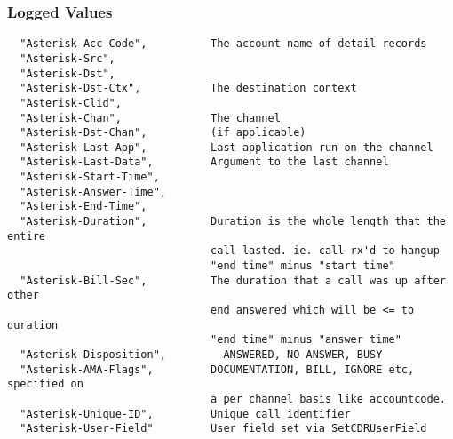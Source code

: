 \subsubsection{Logged Values}
\begin{verbatim}
  "Asterisk-Acc-Code",          The account name of detail records
  "Asterisk-Src",
  "Asterisk-Dst",
  "Asterisk-Dst-Ctx",           The destination context
  "Asterisk-Clid",
  "Asterisk-Chan",              The channel
  "Asterisk-Dst-Chan",	        (if applicable)
  "Asterisk-Last-App",	        Last application run on the channel
  "Asterisk-Last-Data",         Argument to the last channel
  "Asterisk-Start-Time",
  "Asterisk-Answer-Time",
  "Asterisk-End-Time",
  "Asterisk-Duration",          Duration is the whole length that the entire
                                call lasted. ie. call rx'd to hangup
                                "end time" minus "start time"
  "Asterisk-Bill-Sec", 	        The duration that a call was up after other
                                end answered which will be <= to duration
                                "end time" minus "answer time"
  "Asterisk-Disposition",    	  ANSWERED, NO ANSWER, BUSY
  "Asterisk-AMA-Flags",       	DOCUMENTATION, BILL, IGNORE etc, specified on
                                a per channel basis like accountcode.
  "Asterisk-Unique-ID",         Unique call identifier
  "Asterisk-User-Field"	        User field set via SetCDRUserField
\end{verbatim}
